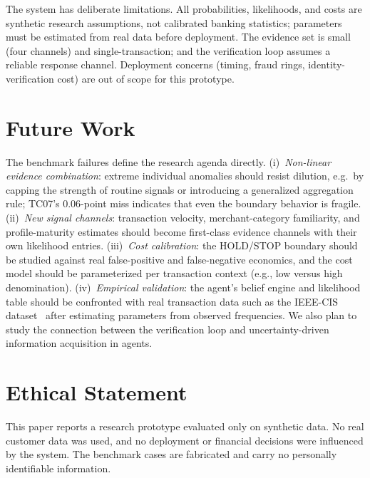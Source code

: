 \documentclass{article}
\begin{document}
The system has deliberate limitations. All probabilities, likelihoods, and
costs are synthetic research assumptions, not calibrated banking statistics;
parameters must be estimated from real data before deployment. The evidence
set is small (four channels) and single-transaction; and the verification loop
assumes a reliable response channel. Deployment concerns (timing, fraud rings,
identity-verification cost) are out of scope for this prototype.

\section{Future Work}

The benchmark failures define the research agenda directly. (i)~\emph{Non-linear
evidence combination}: extreme individual anomalies should resist dilution,
e.g.\ by capping the strength of routine signals or introducing a generalized
aggregation rule; TC07's 0.06-point miss indicates that even the boundary
behavior is fragile. (ii)~\emph{New signal channels}: transaction velocity,
merchant-category familiarity, and profile-maturity estimates should become
first-class evidence channels with their own likelihood entries. (iii)~\emph{Cost
calibration}: the HOLD/STOP boundary should be studied against real
false-positive and false-negative economics, and the cost model should be
parameterized per transaction context (e.g., low versus high denomination).
(iv)~\emph{Empirical validation}: the agent's belief engine and likelihood
table should be confronted with real transaction data such as the IEEE-CIS
dataset~\cite{iececis2019} after estimating parameters from observed
frequencies. We also plan to study the connection between the verification
loop and uncertainty-driven information acquisition in agents.

\section*{Ethical Statement}

This paper reports a research prototype evaluated only on synthetic data.
No real customer data was used, and no deployment or financial decisions were
influenced by the system. The benchmark cases are fabricated and carry no
personally identifiable information.
\end{document}
